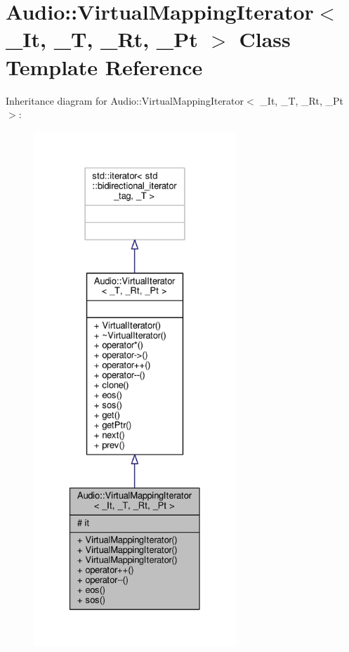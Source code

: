 \hypertarget{classAudio_1_1VirtualMappingIterator}{}\section{Audio\+:\+:Virtual\+Mapping\+Iterator$<$ \+\_\+\+It, \+\_\+T, \+\_\+\+Rt, \+\_\+\+Pt $>$ Class Template Reference}
\label{classAudio_1_1VirtualMappingIterator}


Inheritance diagram for Audio\+:\+:Virtual\+Mapping\+Iterator$<$ \+\_\+\+It, \+\_\+T, \+\_\+\+Rt, \+\_\+\+Pt $>$\+:
\nopagebreak
\begin{figure}[H]
\begin{center}
\leavevmode
\includegraphics[height=550pt]{d4/d4a/classAudio_1_1VirtualMappingIterator__inherit__graph}
\end{center}
\end{figure}


